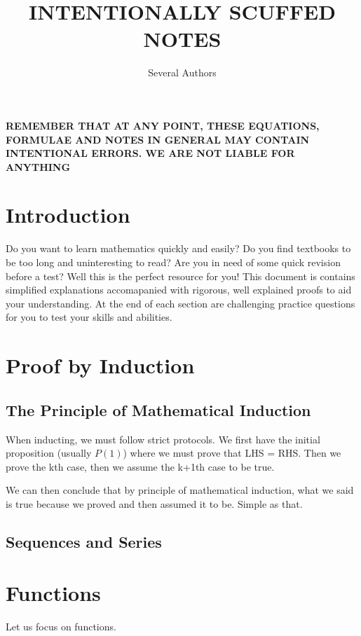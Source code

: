 \documentclass[a4paper]{article}
\theoremstyle{plain}
\theoremstyle{definition}
\theoremstyle{remark}
\newcommand{\sectionSpace}{\vspace{2em}} %
\newcommand{\subsectionSpace}{\vspace{0.5em}}
\begin{document}
\title{INTENTIONALLY SCUFFED NOTES}
\author{Several Authors}
\maketitle
\newpage

\begin{center}
    \Large 
    \textbf{
        REMEMBER THAT AT ANY POINT, THESE EQUATIONS, FORMULAE AND NOTES IN GENERAL MAY CONTAIN INTENTIONAL ERRORS. WE ARE NOT LIABLE FOR ANYTHING} 
\end{center}

\sectionSpace
\section{Introduction}
    Do you want to learn mathematics quickly and easily? Do you find textbooks to be too long and uninteresting to read? Are you in need of some quick revision before a test? Well this is the perfect resource for you! This document is contains simplified explanations accomapanied with rigorous, well explained proofs to aid your understanding. At the end of each section are challenging practice questions for you to test your skills and abilities.


\sectionSpace
\section{Proof by Induction}
    \subsection{The Principle of Mathematical Induction}
    When inducting, we must follow strict protocols. We first have the initial proposition (usually $P(1)$) where we must prove that LHS = RHS. Then we prove the kth case, then we assume the k+1th case to be true. 

    We can then conclude that by principle of mathematical induction, what we said is true because we proved and then assumed it to be. Simple as that.

    \subsectionSpace
    \subsection{Sequences and Series}



\sectionSpace
\section{Functions}
Let us focus on functions. 
\end{document}
